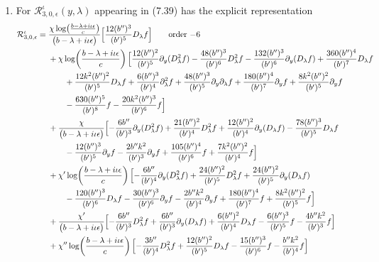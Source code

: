 \documentclass[reqno,11pt]{amsart}
\numberwithin{equation}{section}
\newcommand{\p}{\partial}
\newcommand{\D}{D_\lambda}
\numberwithin{equation}{section} %
\begin{document}
\begin{enumerate}
\item For $\mathcal{R}^\iota_{3,0,\epsilon}(y,\lambda)$ appearing in (7.39) has the explicit representation
\setlength{\jot}{3pt}
\begin{align}
\mathcal{R}^\iota_{3,0,\epsilon}={}&\frac{\chi\log\!\left(\frac{b -\lambda+i\iota\epsilon}{c}\right)}{\bigl(b -\lambda+i\iota\epsilon\bigr)}\Bigl[\frac{12 (b'' )^{3}}{(b' )^{5}} \D f\Bigr]\tag*{\text{order $-6$}}\\
&+\chi\log\!\left(\frac{b -\lambda+i\iota\epsilon}{c}\right)\Bigl[\frac{12 (b'' )^{2}}{(b' )^{5}} \p_y(\D^2 f)- \frac{48 (b'' )^{3}}{(b' )^{6}} \D^2 f- \frac{132 (b'' )^{3}}{(b' )^{6}} \p_y(\D f)+\frac{360 (b'' )^{4}}{(b' )^{7}} \D f\notag\\
&\qquad +\frac{12 k^2 (b'' )^{2}}{(b' )^{5}} \D f+\frac{6 (b'' )^{3}}{(b' )^{4}} \p_\lambda^2 f+\frac{48 (b'' )^{3}}{(b' )^{5}} \p_y\p_\lambda f+\frac{180 (b'' )^{4}}{(b' )^{7}} \p_y f+\frac{8 k^2 (b'' )^{2}}{(b' )^{5}} \p_y f\notag\\
&\qquad - \frac{630 (b'' )^{5}}{(b' )^{8}} f- \frac{20 k^2 (b'' )^{3}}{(b' )^{6}} f\Bigr]\notag\\
&+\frac{\chi}{\bigl(b -\lambda+i\iota\epsilon\bigr)}\Bigl[- \frac{6 b'' }{(b' )^{3}} \p_y(\D^2 f)+\frac{21 (b'' )^{2}}{(b' )^{4}} \D^2 f +\frac{12 (b'' )^{2}}{(b' )^{4}} \p_y(\D f)- \frac{78 (b'' )^{3}}{(b' )^{5}} \D f\notag\\
&\qquad- \frac{12 (b'' )^{3}}{(b' )^{5}} \p_y f- \frac{2 b''  k^2}{(b' )^{3}} \p_y f+\frac{105 (b'' )^{4}}{(b' )^{6}} f+\frac{7 k^2 (b'' )^{2}}{(b' )^{4}} f\Bigr]\notag\\
&+\chi'\log\!\left(\frac{b -\lambda+i\iota\epsilon}{c}\right)\Bigl[- \frac{6 b'' }{(b' )^{4}} \p_y(\D^2 f)+\frac{24 (b'' )^{2}}{(b' )^{5}} \D^2 f+\frac{24 (b'' )^{2}}{(b' )^{5}} \p_y(\D f)\notag\\
&\qquad - \frac{120 (b'' )^{3}}{(b' )^{6}} \D f- \frac{30 (b'' )^{3}}{(b' )^{6}} \p_y f- \frac{2 b''  k^2}{(b' )^{4}} \p_y f+\frac{180 (b'' )^{4}}{(b' )^{7}} f+\frac{8 k^2 (b'' )^{2}}{(b' )^{5}} f\Bigr]\notag\\
&+\frac{\chi'}{\bigl(b -\lambda+i\iota\epsilon\bigr)}\Bigl[- \frac{6 b'' }{(b' )^{3}} \D^2 f+\frac{6 b'' }{(b' )^{3}} \p_y(\D f)+\frac{6 (b'' )^{2}}{(b' )^{4}} \D f- \frac{6 (b'' )^{3}}{(b' )^{5}} f- \frac{4 b''  k^2}{(b' )^{3}} f\Bigr]\notag\\
&+\chi''\log\!\left(\frac{b -\lambda+i\iota\epsilon}{c}\right)\Bigl[- \frac{3 b'' }{(b' )^{4}} \D^2 f+\frac{12 (b'' )^{2}}{(b' )^{5}} \D f- \frac{15 (b'' )^{3}}{(b' )^{6}} f- \frac{b''  k^2}{(b' )^{4}} f\Bigr]\notag\\

\end{align}
\end{enumerate}
\end{document}
